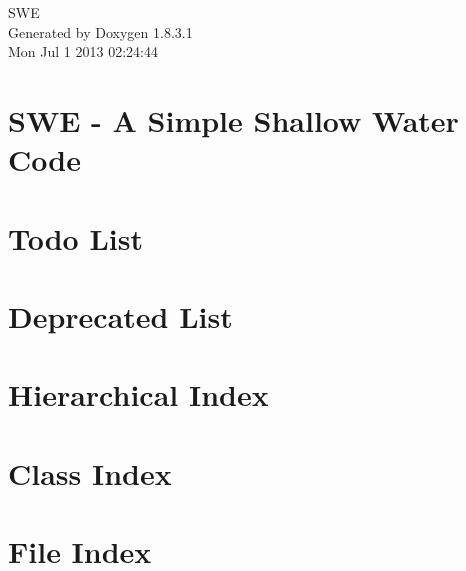 \documentclass{book}
\begin{document}
\hypersetup{pageanchor=false,citecolor=blue}
\begin{titlepage}
\vspace*{7cm}
\begin{center}
{\Large S\-W\-E }\\
\vspace*{1cm}
{\large Generated by Doxygen 1.8.3.1}\\
\vspace*{0.5cm}
{\small Mon Jul 1 2013 02:24:44}\\
\end{center}
\end{titlepage}
\clearemptydoublepage
{}
\tableofcontents
\clearemptydoublepage
{}
\hypersetup{pageanchor=true,citecolor=blue}
\chapter{S\-W\-E -\/ A Simple Shallow Water Code}
\label{index}\hypertarget{index}{}
\chapter{Todo List}
\label{todo}
\hypertarget{todo}{}

\chapter{Deprecated List}
\label{deprecated}
\hypertarget{deprecated}{}

\chapter{Hierarchical Index}

\chapter{Class Index}

\chapter{File Index}

\end{document}
